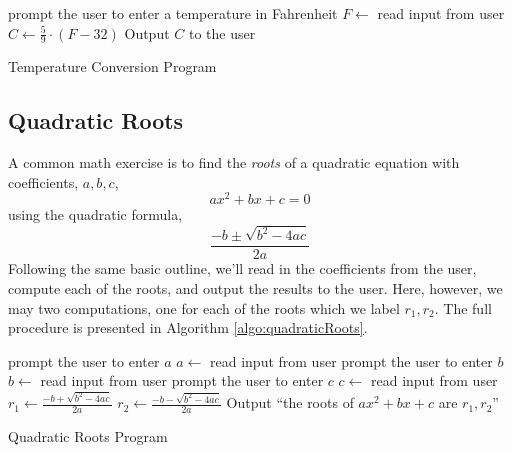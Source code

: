 \begin{algorithm}
prompt the user to enter a temperature in Fahrenheit \;
$F \leftarrow $ read input from user \;
$C \leftarrow \frac{5}{9} \cdot (F-32)$ \;
Output $C$ to the user \;
\caption{Temperature Conversion Program}
\label{algo:temperatureConversion}
\end{algorithm}

\subsection{Quadratic Roots}

A common math exercise is to find the \emph{roots} of a quadratic equation
with coefficients, $a, b, c$,   
  $$ax^2 + bx + c = 0$$
using the quadratic formula, 
  $$\frac{-b \pm \sqrt{b^2 - 4ac}}{2a}$$
Following the same basic outline, we'll read in the coefficients from the user, 
compute each of the roots, and output the results to the user.  Here, however,
we may two computations, one for each of the roots which we label $r_1, r_2$.
The full procedure is presented in Algorithm \ref{algo:quadraticRoots}.

\begin{algorithm}
prompt the user to enter $a$ \;
$a \leftarrow$ read input from user \; 
prompt the user to enter $b$ \;
$b \leftarrow$ read input from user \; 
prompt the user to enter $c$ \;
$c \leftarrow$ read input from user \; 
$r_1 \leftarrow \frac{-b + \sqrt{b^2 - 4ac}}{2a}$ \;
$r_2 \leftarrow \frac{-b - \sqrt{b^2 - 4ac}}{2a}$ \;
Output ``the roots of $ax^2 + bx + c$ are $r_1, r_2$'' \;
\caption{Quadratic Roots Program}
\label{algo:quadraticRoots}
\end{algorithm}


